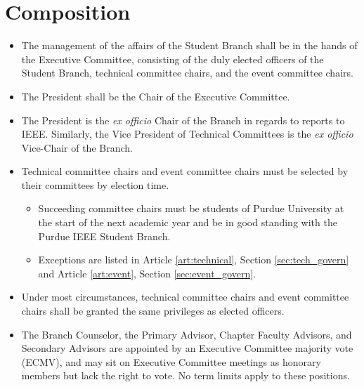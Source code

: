 \documentclass[12pt]{constitution}
\begin{document}
\section{Composition}
\label{sec:exec_comp}
\begin{itemize}
    \item The management of the affairs of the Student Branch shall be in the hands of the Executive Committee, consisting of the duly elected officers of the Student Branch, technical committee chairs, and the event committee chairs.
    \item The President shall be the Chair of the Executive Committee.
    \item The President is the \textit{ex officio} Chair of the Branch in regards to reports to IEEE. Similarly, the Vice President of Technical Committees is the \textit{ex officio} Vice-Chair of the Branch.
    \item Technical committee chairs and event committee chairs must be selected by their committees by election time.
    \begin{itemize}
        \item Succeeding committee chairs must be students of Purdue University at the start of the next academic year and be in good standing with the Purdue IEEE Student Branch.
        \item Exceptions are listed in Article \ref{art:technical}, Section \ref{sec:tech_govern} and Article \ref{art:event}, Section \ref{sec:event_govern}.
    \end{itemize}
    \item Under most circumstances, technical committee chairs and event committee chairs shall be granted the same privileges as elected officers.
    \item The Branch Counselor, the Primary Advisor, Chapter Faculty Advisors, and Secondary Advisors are appointed by an Executive Committee majority vote (ECMV), and may sit on Executive Committee meetings as honorary members but lack the right to vote. No term limits apply to these positions.
\end{itemize}
\end{document}
